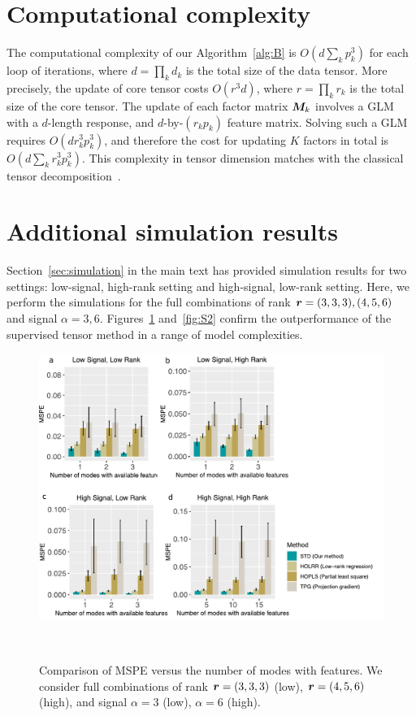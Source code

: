 \documentclass[12pt]{article}
\theoremstyle{definition}
\theoremstyle{definition}
\begin{document}
\section{Computational complexity}
The computational complexity of our Algorithm~\eqref{alg:B} is $O\left(d \sum_k p^3_k\right)$ for each loop of iterations, where $d=\prod_k d_k$ is the total size of the data tensor. More precisely, the update of core tensor costs $O(r^3d)$, where $r=\prod_k r_k$ is the total size of the core tensor. The update of each factor matrix $\bm M_k$ involves a GLM with a $d$-length response, and $d$-by-$(r_kp_k)$ feature matrix. Solving such a GLM requires $O(dr^3_kp^3_k)$, and therefore the cost for updating $K$ factors in total is $O( d\sum_k r^3_k p_k^3)$. This complexity in tensor dimension matches with the classical tensor decomposition~\citep{kolda2009tensor}. 


\section{Additional simulation results}
Section~\ref{sec:simulation} in the main text has provided simulation results for two settings: low-signal, high-rank setting and high-signal, low-rank setting. Here, we perform the simulations for the full combinations of rank $\bm{r}=(3,3,3), (4,5,6)$ and signal $\alpha=3, 6$. Figures~\ref{fig:S1} and~\ref{fig:S2} confirm the outperformance of the supervised tensor method in a range of model complexities.

\begin{figure}[H]
\centering
\includegraphics[width=15cm]{Supp_Figure1.pdf} 
\caption{Comparison of MSPE versus the number of modes with features. We consider full combinations of rank $\bm{r}=(3,3,3)$ (low), $\bm{r}=(4,5,6)$ (high), and signal $\alpha=3$ (low), $\alpha=6$ (high).}~\label{fig:S1}
\end{figure}
\end{document}
